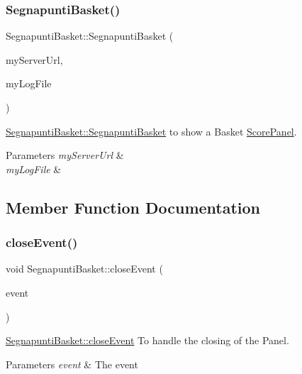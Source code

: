 \subsubsection{\texorpdfstring{Segnapunti\+Basket()}{SegnapuntiBasket()}}
{\footnotesize\ttfamily Segnapunti\+Basket\+::\+Segnapunti\+Basket (\begin{DoxyParamCaption}\item[{const Q\+String \&}]{my\+Server\+Url,  }\item[{Q\+File $\ast$}]{my\+Log\+File }\end{DoxyParamCaption})\hspace{0.3cm}{\ttfamily [explicit]}}



\mbox{\hyperlink{classSegnapuntiBasket_aeaee10f4af8caa073e2b7016999d7c45}{Segnapunti\+Basket\+::\+Segnapunti\+Basket}} to show a Basket \mbox{\hyperlink{classScorePanel}{Score\+Panel}}. 


\begin{DoxyParams}{Parameters}
{\em my\+Server\+Url} & \\
\hline
{\em my\+Log\+File} & \\
\hline
\end{DoxyParams}


\subsection{Member Function Documentation}
\mbox{\label{classSegnapuntiBasket_a6b92efc36a2ec2057f1abce069fe870d}} 
\subsubsection{\texorpdfstring{close\+Event()}{closeEvent()}}
{\footnotesize\ttfamily void Segnapunti\+Basket\+::close\+Event (\begin{DoxyParamCaption}\item[{Q\+Close\+Event $\ast$}]{event }\end{DoxyParamCaption})}



\mbox{\hyperlink{classSegnapuntiBasket_a6b92efc36a2ec2057f1abce069fe870d}{Segnapunti\+Basket\+::close\+Event}} To handle the closing of the Panel. 


\begin{DoxyParams}{Parameters}
{\em event} & The event \\
\hline
\end{DoxyParams}
\mbox{\label{classSegnapuntiBasket_a4fd8f038194cbb70dd732babc6ab3dfa}} 
